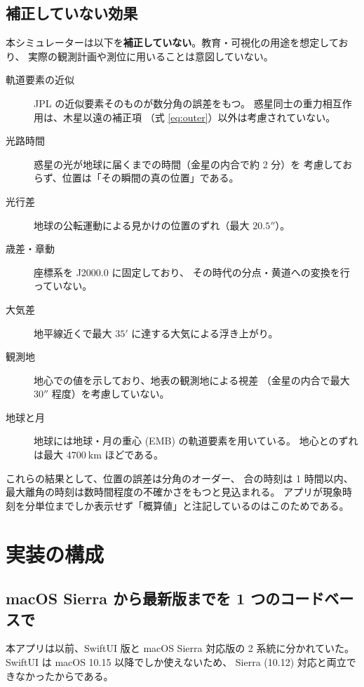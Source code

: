 \documentclass[a4paper,11pt]{ltjsarticle}
\begin{document}
\subsection{補正していない効果}

本シミュレーターは以下を\textbf{補正していない}。教育・可視化の用途を想定しており、
実際の観測計画や測位に用いることは意図していない。

\begin{description}
  \item[軌道要素の近似] JPL の近似要素そのものが数分角の誤差をもつ。
        惑星同士の重力相互作用は、木星以遠の補正項
        （式 \eqref{eq:outer}）以外は考慮されていない。
  \item[光路時間] 惑星の光が地球に届くまでの時間（金星の内合で約 2 分）を
        考慮しておらず、位置は「その瞬間の真の位置」である。
  \item[光行差] 地球の公転運動による見かけの位置のずれ（最大 $20.5''$）。
  \item[歳差・章動] 座標系を J2000.0 に固定しており、
        その時代の分点・黄道への変換を行っていない。
  \item[大気差] 地平線近くで最大 $35'$ に達する大気による浮き上がり。
  \item[観測地] 地心での値を示しており、地表の観測地による視差
        （金星の内合で最大 $30''$ 程度）を考慮していない。
  \item[地球と月] 地球には地球・月の重心 (EMB) の軌道要素を用いている。
        地心とのずれは最大 $4700\ \mathrm{km}$ ほどである。
\end{description}

これらの結果として、位置の誤差は分角のオーダー、
合の時刻は 1 時間以内、最大離角の時刻は数時間程度の不確かさをもつと見込まれる。
アプリが現象時刻を分単位までしか表示せず「概算値」と注記しているのはこのためである。

\section{実装の構成}

\subsection{macOS Sierra から最新版までを 1 つのコードベースで}

本アプリは以前、SwiftUI 版と macOS Sierra 対応版の 2 系統に分かれていた。
SwiftUI は macOS 10.15 以降でしか使えないため、
Sierra (10.12) 対応と両立できなかったからである。
\end{document}
